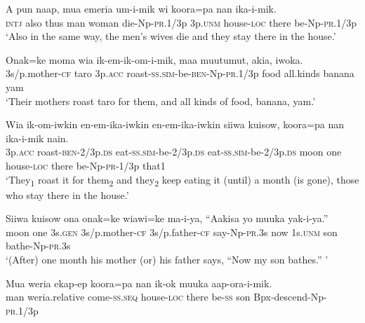 \ea
\gll  A  pun  naap,  mua  emeria  um-i-mik  wi  koora=pa  nan          ika-i-mik. \\
\textsc{intj}  also  thus  man  woman  die-Np-\textsc{pr}.1/3p  3p.\textsc{unm}  house-\textsc{loc}  there be-Np-\textsc{pr}.1/3p \\


\glt ‘Also in the same way, the men’s wives die and they stay there in the house.’ \\
\z


\ea
\gll  Onak=ke  moma  wia  ik-em-ik-om-i-mik,  maa                   muutumut,  akia,  iwoka. \\
3s/p.mother-\textsc{cf}  taro  3p.\textsc{acc}  roast-\textsc{ss}.\textsc{sim}-be-\textsc{ben}-Np-\textsc{pr}.1/3p  food  all.kinds  banana  yam \\


\glt ‘Their mothers roast taro for them, and all kinds of food, banana, yam.’ \\
\z


\ea
\gll  Wia  ik-om-iwkin  en-em-ika-iwkin  en-em-ika-iwkin                siiwa  kuisow,  koora=pa  nan  ika-i-mik  nain. \\
3p.\textsc{acc}  roast-\textsc{ben}-2/3p.\textsc{ds}  eat-\textsc{ss}.\textsc{sim}-be-2/3p.\textsc{ds}  eat-\textsc{ss}.\textsc{sim}-be-2/3p.\textsc{ds} moon  one  house-\textsc{loc}  there  be-Np-\textsc{pr}-1/3p  that1 \\


\glt ‘They\textsubscript{1} roast it for them\textsubscript{2 }and they\textsubscript{2} keep eating it (until) a month (is gone), those who stay there in the house.’ \\
\z


\ea
\gll  Siiwa  kuisow  ona  onak=ke  wiawi=ke  ma-i-ya,  “Aakisa        yo  muuka  yak-i-ya.” \\
moon  one  3s.\textsc{gen}  3s/p.mother-\textsc{cf}  3s/p.father-\textsc{cf}  say-Np-\textsc{pr}.3s  now  1s.\textsc{unm}  son  bathe-Np-\textsc{pr}.3s \\


\glt ‘(After) one month his mother (or) his father says, “Now my son bathes.” ’ \\
\z


\ea
\gll  Mua  weria  ekap-ep  koora=pa  nan  ik-ok  muuka         aap-ora-i-mik. \\
man  weria.relative  come-\textsc{ss.seq}  house-\textsc{loc}  there  be-\textsc{ss}  son Bpx-descend-Np-\textsc{pr}.1/3p \\


